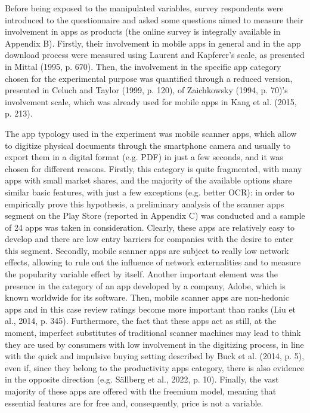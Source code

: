 Before being exposed to the manipulated variables, survey respondents were introduced to the questionnaire and asked some questions aimed to measure their involvement in apps as products (the online survey is integrally available in Appendix B). Firstly, their involvement in mobile apps in general and in the app download process were measured using Laurent and Kapferer’s scale, as presented in Mittal (1995, p. 670). Then, the involvement in the specific app category chosen for the experimental purpose was quantified through a reduced version, presented in Celuch and Taylor (1999, p. 120), of Zaichkowsky (1994, p. 70)'s involvement scale, which was already used for mobile apps in Kang et al. (2015, p. 213).

The app typology used in the experiment was mobile scanner apps, which allow to digitize physical documents through the smartphone camera and usually to export them in a digital format (e.g. PDF) in just a few seconds, and it was chosen for different reasons. Firstly, this category is quite fragmented, with many apps with small market shares, and the majority of the available options share similar basic features, with just a few exceptions (e.g. better OCR): in order to empirically prove this hypothesis, a preliminary analysis of the scanner apps segment on the Play Store (reported in Appendix C) was conducted and a sample of 24 apps was taken in consideration. Clearly, these apps are relatively easy to develop and there are low entry barriers for companies with the desire to enter this segment. Secondly, mobile scanner apps are subject to really low network effects, allowing to rule out the influence of network externalities and to measure the popularity variable effect by itself. Another important element was the presence in the category of an app developed by a company, Adobe, which is known worldwide for its software. Then, mobile scanner apps are non-hedonic apps and in this case review ratings become more important than ranks (Liu et al., 2014, p. 345). Furthermore, the fact that these apps act as still, at the moment, imperfect substitutes of traditional scanner machines may lead to think they are used by consumers with low involvement in the digitizing process, in line with the quick and impulsive buying setting described by Buck et al. (2014, p. 5), even if, since they belong to the productivity apps category, there is also evidence in the opposite direction (e.g. Sällberg et al., 2022, p. 10). Finally, the vast majority of these apps are offered with the freemium model, meaning that essential features are for free and, consequently, price is not a variable.

